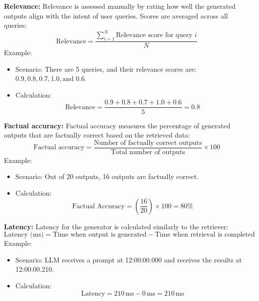 \textbf{Relevance:}
    Relevance is assessed manually by rating how well the generated outputs align with the intent of user queries. Scores are averaged across all queries:
    \[
    \text{Relevance} = \frac{\sum_{i=1}^{N} \text{Relevance score for query } i}{N}
    \]
    Example:
    \begin{itemize}
        \item Scenario: There are 5 queries, and their relevance scores are: \( 0.9, 0.8, 0.7, 1.0, \text{and } 0.6 \).

        \item Calculation:
        \begin{equation*}
        \text{Relevance} = \frac{0.9 + 0.8 + 0.7 + 1.0 + 0.6}{5} = 0.8
        \end{equation*}     
    \end{itemize}

\textbf{Factual accuracy:}
    Factual accuracy measures the percentage of generated outputs that are factually correct based on the retrieved data:
    \[
    \text{Factual accuracy} = \frac{\text{Number of factually correct outputs}}{\text{Total number of outputs}} \times 100
    \]
    Example:
    \begin{itemize}
        \item Scenario: Out of 20 outputs, 16 outputs are factually correct.

        \item Calculation:
        \begin{equation*}
        \text{Factual Accuracy} = \left( \frac{16}{20} \right) \times 100 = 80\%
        \end{equation*}
        
    \end{itemize}

\textbf{Latency:}
    Latency for the generator is calculated similarly to the retriever:
    \[
    \text{Latency (ms)} = \text{Time when output is generated} - \text{Time when retrieval is completed}
    \]
    Example:
    \begin{itemize}
        \item Scenario: LLM receives a prompt at 12:00:00.000 and receives the results at 12:00:00.210.
    
        \item Calculation:
        \begin{equation*}
        \text{Latency} = 210 \, \text{ms} - 0 \, \text{ms} = 210 \, \text{ms}
        \end{equation*}

    \end{itemize}
    

